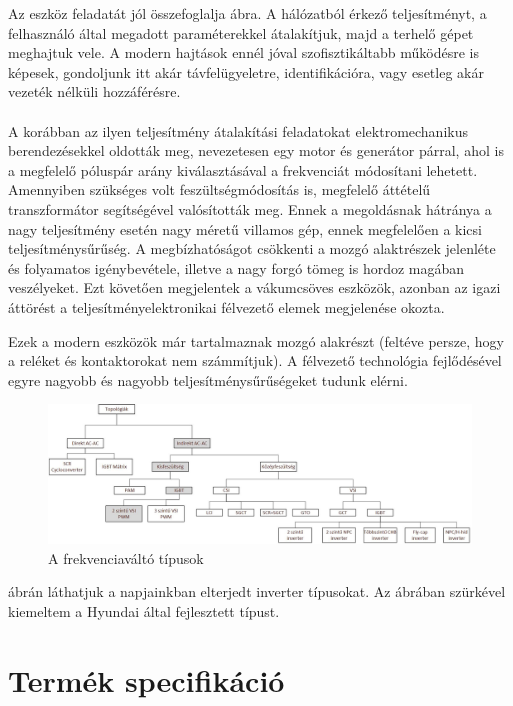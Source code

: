 Az eszköz feladatát jól összefoglalja  ábra. A hálózatból érkező teljesítményt, a felhasználó által megadott paraméterekkel átalakítjuk, majd a terhelő gépet meghajtuk vele. A modern hajtások ennél jóval szofisztikáltabb működésre is képesek, gondoljunk itt akár távfelügyeletre, identifikációra, vagy esetleg akár vezeték nélküli hozzáférésre.

\paragraph{}
A korábban az ilyen teljesítmény átalakítási feladatokat elektromechanikus berendezésekkel oldották meg, nevezetesen egy motor és generátor párral, ahol is a megfelelő póluspár arány kiválasztásával a frekvenciát módosítani lehetett. Amennyiben szükséges volt feszültségmódosítás is, megfelelő áttételű transzformátor segítségével valósították meg. Ennek a megoldásnak hátránya a nagy teljesítmény esetén nagy méretű villamos gép, ennek megfelelően a kicsi teljesítménysűrűség. A megbízhatóságot csökkenti a mozgó alaktrészek jelenléte és folyamatos igénybevétele, illetve a nagy forgó tömeg is hordoz magában veszélyeket. Ezt követően megjelentek a vákumcsöves eszközök, azonban az igazi áttörést a teljesítményelektronikai félvezető elemek megjelenése okozta.

Ezek a modern eszközök már tartalmaznak mozgó alakrészt (feltéve persze, hogy a reléket és kontaktorokat nem számmítjuk). A félvezető technológia fejlődésével egyre nagyobb és nagyobb teljesítménysűrűségeket tudunk elérni.

\begin{figure}[!h]
	\centering
	\includegraphics[width = \textwidth]{figures/topologies.jpg}
	\caption{A frekvenciaváltó típusok} 
	\label{fig:topologies}
\end{figure}

 ábrán láthatjuk a napjainkban elterjedt inverter típusokat. Az ábrában szürkével kiemeltem a Hyundai által fejlesztett típust.

\section{Termék specifikáció}

